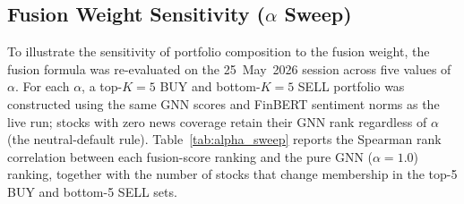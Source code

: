 \documentclass[a4paper,11pt]{report}
\begin{document}
\subsection{Fusion Weight Sensitivity ($\alpha$ Sweep)}
\label{sec:alpha_sweep}

To illustrate the sensitivity of portfolio composition to the fusion weight, the fusion formula was re-evaluated on the 25~May~2026 session across five values of $\alpha$. For each $\alpha$, a top-$K{=}5$ BUY and bottom-$K{=}5$ SELL portfolio was constructed using the same GNN scores and FinBERT sentiment norms as the live run; stocks with zero news coverage retain their GNN rank regardless of $\alpha$ (the neutral-default rule). Table~\ref{tab:alpha_sweep} reports the Spearman rank correlation between each fusion-score ranking and the pure GNN ($\alpha{=}1.0$) ranking, together with the number of stocks that change membership in the top-5 BUY and bottom-5 SELL sets.

\begin{table}[h!]
\centering
\small
\caption{Alpha sensitivity analysis on the 25~May~2026 session ($K{=}5$, Hybrid BiGRU, $N{=}21$ NIFTY~500 candidates). $\rho$: Spearman rank correlation of fusion scores with pure GNN ($\alpha{=}1.0$) ranking. BUY/SELL changes: number of stocks that enter or leave the set relative to the $\alpha{=}1.0$ baseline.}
\label{tab:alpha_sweep}
\end{table}
\end{document}
